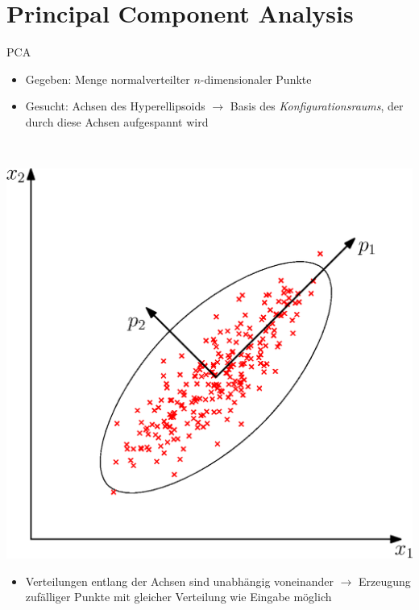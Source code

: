 \documentclass{beamer}
\begin{document}
\section{Principal Component Analysis}
\begin{frame}{PCA}
 \begin{minipage}{0.6\textwidth}
   \begin{itemize}
    \item Gegeben: Menge normalverteilter $n$-dimensionaler Punkte
    \item Gesucht: Achsen des Hyperellipsoids $\rightarrow$ Basis des \emph{Konfigurationsraums}, der durch diese Achsen aufgespannt wird
  \end{itemize}
 \end{minipage}~
 \begin{minipage}{0.4\textwidth}
  \includegraphics[width=\textwidth]{graphics/pca}
 \end{minipage}
 
 \begin{itemize}
  \item Verteilungen entlang der Achsen sind unabhängig voneinander $\rightarrow$ Erzeugung zufälliger Punkte mit gleicher Verteilung wie Eingabe möglich
 \end{itemize}
\end{frame}
\end{document}
